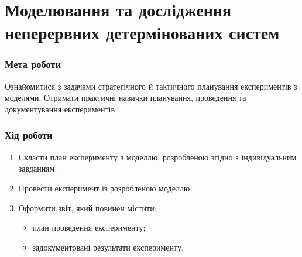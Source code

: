 


\newcommand{\labnumber}{6} %



\graphicspath{{figures/}}


\Ukrainian


\addtocounter{page}{1}

\section*{Моделювання та дослідження неперервних детермінованих систем}
\subsubsection*{Мета роботи}
Ознайомитися з задачами стратегічного й тактичного планування експериментів з моделями. 
Отримати практичні навички планування, проведення та документування експериментів 
\subsubsection*{Хід роботи}
\begin{enumerate}
\item Скласти план експерименту з моделлю, розробленою згідно з індивідуальним завданням.
\item Провести експеримент із розробленою моделлю.
\item Оформити звіт, який повинен містити:
\begin{itemize}
\item план проведення експерименту;
\item задокументовані результати експерименту. 
\end{itemize}
\end{enumerate}


